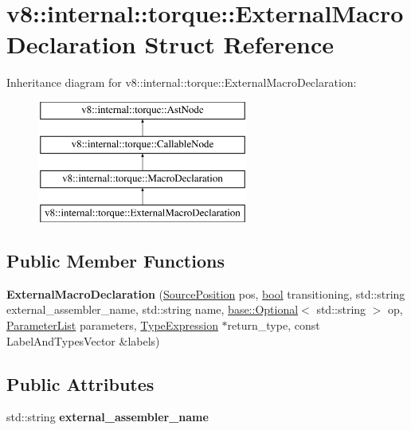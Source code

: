 \hypertarget{structv8_1_1internal_1_1torque_1_1ExternalMacroDeclaration}{}\section{v8\+:\+:internal\+:\+:torque\+:\+:External\+Macro\+Declaration Struct Reference}
\label{structv8_1_1internal_1_1torque_1_1ExternalMacroDeclaration}
Inheritance diagram for v8\+:\+:internal\+:\+:torque\+:\+:External\+Macro\+Declaration\+:\begin{figure}[H]
\begin{center}
\leavevmode
\includegraphics[height=4.000000cm]{structv8_1_1internal_1_1torque_1_1ExternalMacroDeclaration}
\end{center}
\end{figure}
\subsection*{Public Member Functions}
\begin{DoxyCompactItemize}
\item 
\mbox{\label{structv8_1_1internal_1_1torque_1_1ExternalMacroDeclaration_ac2c4ca0da7883fa1ab7ce7bdec58ac43}} 
{\bfseries External\+Macro\+Declaration} (\mbox{\hyperlink{structv8_1_1internal_1_1torque_1_1SourcePosition}{Source\+Position}} pos, \mbox{\hyperlink{classbool}{bool}} transitioning, std\+::string external\+\_\+assembler\+\_\+name, std\+::string name, \mbox{\hyperlink{classv8_1_1base_1_1Optional}{base\+::\+Optional}}$<$ std\+::string $>$ op, \mbox{\hyperlink{structv8_1_1internal_1_1torque_1_1ParameterList}{Parameter\+List}} parameters, \mbox{\hyperlink{structv8_1_1internal_1_1torque_1_1TypeExpression}{Type\+Expression}} $\ast$return\+\_\+type, const Label\+And\+Types\+Vector \&labels)
\end{DoxyCompactItemize}
\subsection*{Public Attributes}
\begin{DoxyCompactItemize}
\item 
\mbox{\label{structv8_1_1internal_1_1torque_1_1ExternalMacroDeclaration_ab2e9715c1b4f5d8d3f01d1071b01474a}} 
std\+::string {\bfseries external\+\_\+assembler\+\_\+name}
\end{DoxyCompactItemize}
